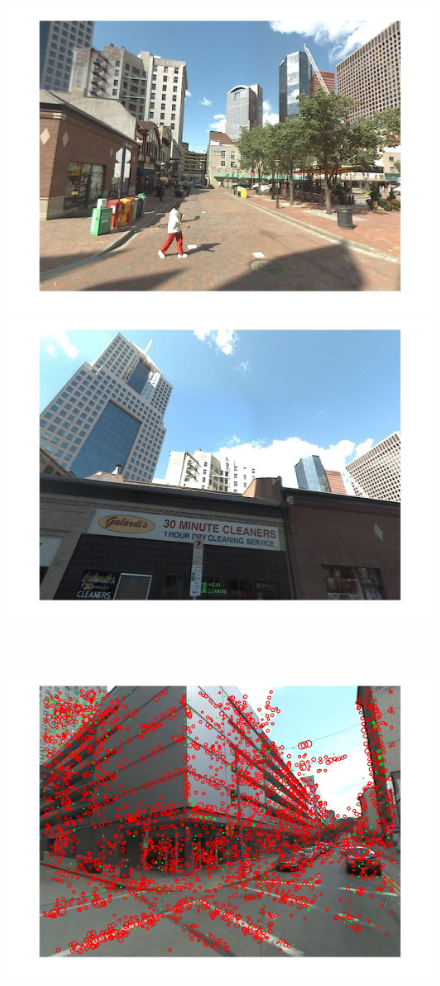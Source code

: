 \begin{figure}
\begin{minipage}{0.48\linewidth}
\begin{minipage}{\wii}
            \includegraphics[width=\linewidth]{imgs/wVS3q/2932/b.jpg}
          \end{minipage}  
          \begin{minipage}{\wii}
            \centering
            \includegraphics[width=\linewidth]{imgs/wVS3q/2932/c.jpg}
          \end{minipage} 
          \\
          \begin{minipage}{\wii}
            \centering
            \includegraphics[width=\linewidth]{imgs/wVS3q/2932/aftrs.jpg}

\end{minipage}
\end{minipage}
\end{figure}
